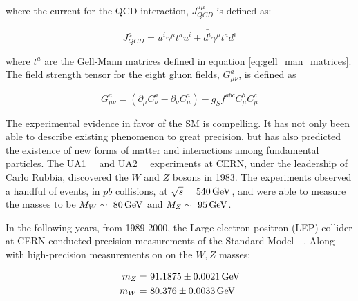 \noindent where the current for the QCD interaction, $J_{QCD}^{a\mu}$
is defined as:

\begin{equation}\label{eq:sm_qcd_current}
J_{QCD}^{a} = \bar{u^{i}}\gamma^{\mu}t^{a}u^{i} + \bar{d^{i}}\gamma^{\mu}t^{a}d^{i}
\end{equation}

\noindent where $t^{a}$ are the Gell-Mann matrices defined in equation
\ref{eq:gell_man_matrices}.  The field strength tensor for the eight gluon fields,
$G_{\mu\nu}^{a}$, is defined as

\begin{equation}\label{eq:sm_gluon_field_strength_tensor}
G_{\mu\nu}^{a} = (\partial_{\mu}C_{\nu}^{a}
- \partial_{\nu}C_{\mu}^{a}) - g_{S}f^{abc}C_{\mu}^{b}C_{\mu}^{c}  
\end{equation} 

\par The experimental evidence in favor of the SM is compelling.
It has not only been able to describe existing phenomenon to great
precision, but has also predicted the existence of new forms of matter
and interactions among fundamental particles.  The
UA1~\cite{ex:UA1_W}~\cite{ex:UA1_Z} and UA2~\cite{ex:UA2_W}~\cite{ex:UA2_Z}
experiments at CERN, under the leadership of Carlo Rubbia, discovered
the $W$ and $Z$ bosons in 1983.  The experiments observed a handful of
events, in $p\bar{b}$ collisions, at $\sqrt{s}=540\,\text{Ge\hspace{-.08em}V}$, and were able
to measure the masses to be $M_{W}\sim~80\,\text{Ge\hspace{-.08em}V}$ and
$M_{Z}\sim~95\,\text{Ge\hspace{-.08em}V}$.  

\par In the following years, from 1989-2000, the Large
electron-positron (LEP) collider at CERN conducted precision measurements of
the Standard Model~\cite{ex:LEP_Z-Pole}~\cite{ex:LEP-2_W}.  Along with
high-precision measurements on on the $W,Z$ masses:

\begin{equation}\label{eq:lep_WZ_masses}
\begin{aligned}
m_{Z} =&~ 91.1875 \pm 0.0021\,\text{Ge\hspace{-.08em}V} \\
m_{W} =&~ 80.376 \pm 0.0033\,\text{Ge\hspace{-.08em}V} 
\end{aligned}
\end{equation}  


